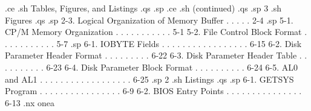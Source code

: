 .ce
.sh
Tables, Figures, and Listings
.qs
.sp
.ce
.sh
(continued)
.qs
.sp 3
.sh
Figures
.qs
.sp
     2-3.   Logical Organization of Memory Buffer . . . . .   2-4
.sp
     5-1.   CP/M Memory Organization  . . . . . . . . . . .   5-1
     5-2.   File Control Block Format . . . . . . . . . . .   5-7
.sp
     6-1.   IOBYTE Fields . . . . . . . . . . . . . . . . .  6-15
     6-2.   Disk Parameter Header Format  . . . . . . . . .  6-22
     6-3.   Disk Parameter Header Table . . . . . . . . . .  6-23
     6-4.   Disk Parameter Block Format . . . . . . . . . .  6-24
     6-5.   AL0 and AL1 . . . . . . . . . . . . . . . . . .  6-25
.sp 2
.sh
Listings
.qs
.sp
     6-1.   GETSYS Program  . . . . . . . . . . . . . . . .   6-9
     6-2.   BIOS Entry Points . . . . . . . . . . . . . . .  6-13
.nx onea
